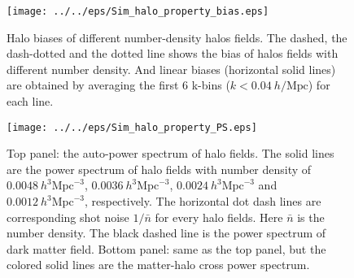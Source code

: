 \begin{figure}[tbp]
\begin{center}
\texttt{[image: ../../eps/Sim\_halo\_property\_bias.eps]}
\end{center}
\caption{Halo biases of different number-density halos fields.
The dashed, the dash-dotted and the dotted line shows the bias of halos
 fields with different number density. And linear biases (horizontal solid
  lines) are  obtained by averaging the first 6 k-bins 
  ($k< 0.04\ h/\mathrm{Mpc}$) for each line. }
\label{fig:Sim_bias}
\end{figure}

\begin{figure}[tbp]
\begin{center}
\texttt{[image: ../../eps/Sim\_halo\_property\_PS.eps]}
\end{center}
\caption{Top panel: the auto-power spectrum of halo fields. The 
solid lines are the power spectrum of halo fields with number density of
$0.0048\ h^{3}\mathrm{Mpc}^{-3}$, $0.0036\ h^{3}\mathrm{Mpc}^{-3}$, 
$0.0024\ h^{3}\mathrm{Mpc}^{-3}$ and $0.0012\ h^{3}\mathrm{Mpc}^{-3}$,
 respectively.
The horizontal dot dash lines are corresponding shot noise $1/\bar{n}$ 
for every halo fields. Here $\bar{n}$ is the number density.
The black dashed line is the power
spectrum of dark matter field.
Bottom panel: same as the top panel, but the colored solid lines are the 
matter-halo cross power spectrum.}
\label{fig:Sim_PS}
\end{figure}



